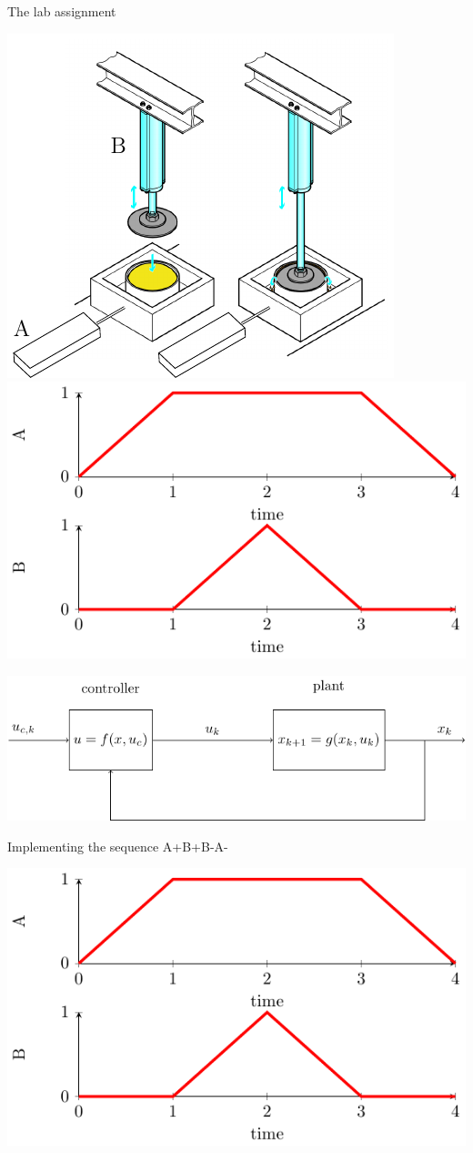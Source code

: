 \documentclass[presentation,aspectratio=1610]{beamer}
\begin{document}
\begin{frame}[label={sec:org559d99e}]{The lab assignment}
\begin{center}
\includegraphics[width=0.4\linewidth]{../../figures/cheese-pressing-two-cylinders}
 \includegraphics[width=0.58\linewidth]{../../figures/AplusBplusBminAmin}
\end{center}

\begin{center}
\includegraphics[width=0.8\linewidth]{../../figures/logic-control-loop}
\end{center}
\end{frame}


\begin{frame}[label={sec:org9570e2e}]{Implementing the sequence A+B+B-A-}
\begin{center}
\includegraphics[width=0.8\linewidth]{../../figures/AplusBplusBminAmin}
\end{center}
\end{frame}
\end{document}

